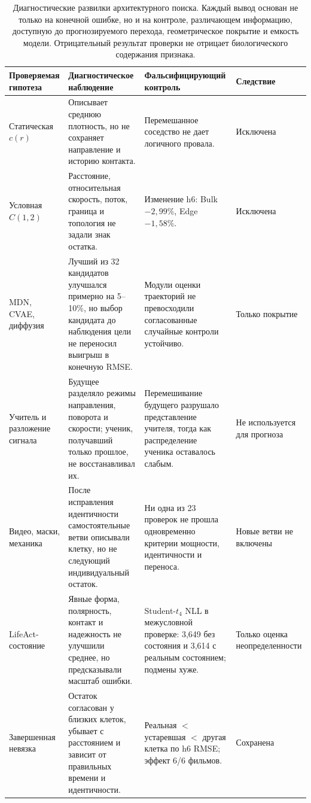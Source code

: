 \documentclass[11pt,a4paper]{article}
\begin{document}
\begin{table}[H]
\centering
\caption{Диагностические развилки архитектурного поиска. Каждый вывод основан не только на конечной ошибке, но и на контроле, различающем информацию, доступную до прогнозируемого перехода, геометрическое покрытие и емкость модели. Отрицательный результат проверки не отрицает биологического содержания признака.}
\label{tab:search}
\small
\begin{tabularx}{\textwidth}{@{}L{0.19\textwidth} Y L{0.24\textwidth} L{0.13\textwidth}@{}}
\toprule
Проверяемая гипотеза & Диагностическое наблюдение & Фальсифицирующий контроль & Следствие \\
\midrule
Статическая $c(r)$ & Описывает среднюю плотность, но не сохраняет направление и историю контакта. &
Перемешанное соседство не дает логичного провала. & Исключена \\
Условная $C(1,2)$ & Расстояние, относительная скорость, поток, граница и топология не задали знак остатка. &
Изменение h6: Bulk $-2{,}99\%$, Edge $-1{,}58\%$. & Исключена \\
MDN, CVAE, диффузия & Лучший из 32 кандидатов улучшался примерно на 5--10\%, но выбор кандидата до наблюдения цели не переносил выигрыш в конечную RMSE. &
Модули оценки траекторий не превосходили согласованные случайные контроли устойчиво. & Только покрытие \\
Учитель и разложение сигнала & Будущее разделяло режимы направления, поворота и скорости; ученик, получавший только прошлое, не восстанавливал их. &
Перемешивание будущего разрушало представление учителя, тогда как распределение ученика оставалось слабым. & Не используется для прогноза \\
Видео, маски, механика & После исправления идентичности самостоятельные ветви описывали клетку, но не следующий индивидуальный остаток. &
Ни одна из 23 проверок не прошла одновременно критерии мощности, идентичности и переноса. & Новые ветви не включены \\
LifeAct-состояние & Явные форма, полярность, контакт и надежность не улучшили среднее, но предсказывали масштаб ошибки. &
Student-$t_4$ NLL в межусловной проверке: 3,649 без состояния и 3,614 с реальным состоянием; подмены хуже. & Только оценка неопределенности \\
Завершенная невязка & Остаток согласован у близких клеток, убывает с расстоянием и зависит от правильных времени и идентичности. &
Реальная $<$ устаревшая $<$ другая клетка по h6 RMSE; эффект 6/6 фильмов. & Сохранена \\
\bottomrule
\end{tabularx}
\end{table}
\end{document}

